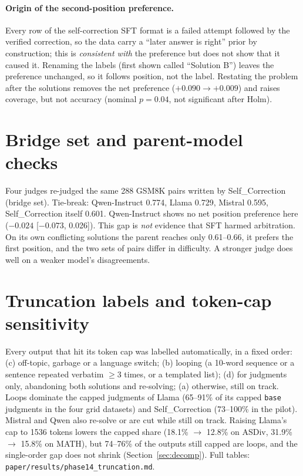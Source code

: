 \documentclass[11pt]{article}
\begin{document}
\paragraph{Origin of the second-position preference.} Every row of the self-correction SFT format is a
failed attempt followed by the verified correction, so the data carry a ``later answer is right'' prior by
construction; this is \emph{consistent with} the preference but does not show that it caused it. Renaming
the labels (first shown called ``Solution B'') leaves the preference unchanged, so it follows position, not
the label. Restating the problem after the solutions removes the net preference ($+0.090\to+0.009$) and raises
coverage, but not accuracy (nominal $p=0.04$, not significant after Holm).

\section{Bridge set and parent-model checks}
Four judges re-judged the same 288 GSM8K pairs written by Self\_Correction (bridge set). Tie-break: Qwen-Instruct
0.774, Llama 0.729, Mistral 0.595, Self\_Correction itself 0.601. Qwen-Instruct shows no net position
preference here ($-0.024$ [$-0.073$, 0.026]). This gap is \emph{not} evidence that SFT harmed arbitration.
On its own conflicting solutions the parent reaches only 0.61--0.66, it prefers the first position, and the
two sets of pairs differ in difficulty. A stronger judge does well on a weaker model's disagreements.

\section{Truncation labels and token-cap sensitivity}
Every output that hit its token cap was labelled automatically, in a fixed order: (c) off-topic, garbage or a
language switch; (b) looping (a 10-word sequence or a sentence repeated verbatim $\geq$3 times, or a templated
list); (d) for judgments only, abandoning both solutions and re-solving; (a) otherwise, still on track. Loops
dominate the capped judgments of Llama (65--91\% of its capped \texttt{base} judgments in the four grid
datasets) and Self\_Correction (73--100\% in the pilot). Mistral and Qwen also re-solve or are cut while still on track. Raising Llama's cap
to 1536 tokens lowers the capped share (18.1\% $\to$ 12.8\% on ASDiv, 31.9\% $\to$ 15.8\% on MATH), but 74--76\%
of the outputs still capped are loops, and the single-order gap does not shrink (Section~\ref{sec:decomp}). Full tables:
\texttt{paper/results/phase14\_truncation.md}.
\end{document}
